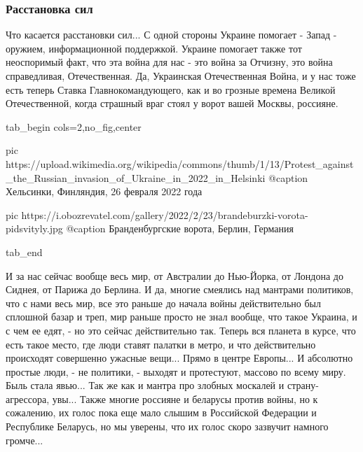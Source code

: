  
 
 
 
 

\subsubsection{Расстановка сил}

Что касается расстановки сил... С одной стороны Украине помогает - Запад -
оружием, информационной поддержкой. Украине помогает также тот неоспоримый
факт, что эта война для нас - это война за Отчизну, это война справедливая,
Отечественная. Да, Украинская Отечественная Война, и у нас тоже есть теперь
Ставка Главнокомандующего, как и во грозные времена Великой Отечественной,
когда страшный враг стоял у ворот вашей Москвы, россияне.

\ifcmt
  tab_begin cols=2,no_fig,center

     pic https://upload.wikimedia.org/wikipedia/commons/thumb/1/13/Protest_against_the_Russian_invasion_of_Ukraine_in_2022_in_Helsinki%
		 @caption Хельсинки, Финляндия, 26 февраля 2022 года
		 
		 pic https://i.obozrevatel.com/gallery/2022/2/23/brandeburzki-vorota-pidsvityly.jpg
		 @caption Бранденбургские ворота, Берлин, Германия

  tab_end
\fi

И за нас сейчас вообще весь мир, от Австралии до Нью-Йорка, от Лондона до
Сиднея, от Парижа до Берлина. И да, многие смеялись над мантрами политиков, что
с нами весь мир, все это раньше до начала войны действительно был сплошной
базар и треп, мир раньше просто не знал вообще, что такое Украина, и с чем ее
едят, - но это сейчас действительно так. Теперь вся планета в курсе, что есть
такое место, где люди ставят палатки в метро, и что действительно происходят
совершенно ужасные вещи... Прямо в центре Европы...  И абсолютно простые люди,
- не политики, - выходят и протестуют, массово по всему миру. Быль стала
явью... Так же как и мантра про злобных москалей и страну-агрессора, увы...
Также многие россияне и беларусы против войны, но к сожалению, их голос пока
еще мало слышим в Российской Федерации и Республике Беларусь, но мы уверены,
что их голос скоро зазвучит намного громче... 

